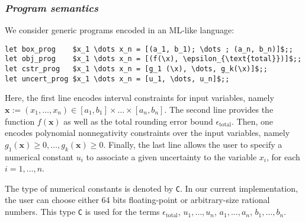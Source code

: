 \documentclass[preprint]{sigplanconf}
\newcommand{\code}[1]{\lstinline{#1}}
\newcommand{\x}{\mathbf{x}}
\theoremstyle{plain}
\begin{document}
\subsubsection*{\textit{Program semantics}}
%
We consider generic programs encoded in an ML-like language:
\begin{lstlisting}
let box_prog    $x_1 \dots x_n = [(a_1, b_1); \dots ; (a_n, b_n)]$;;
let obj_prog    $x_1 \dots x_n = [(f(\x), \epsilon_{\text{total}})]$;;
let cstr_prog   $x_1 \dots x_n = [g_1 (\x), \dots, g_k(\x)]$;;
let uncert_prog $x_1 \dots x_n = [u_1, \dots, u_n]$;;
\end{lstlisting}
Here, the first line encodes interval constraints for input variables, namely $\x := (x_1, \dots, x_n) \in [a_1, b_1]\times \dots \times [a_n, b_n]$.
The second line provides the function $f(\x)$ as well as the total rounding error bound $\epsilon_{\text{total}}$.
Then, one encodes polynomial nonnegativity constraints over the input variables, namely $g_1(\x) \geq 0, \dots, g_k(\x) \geq 0$. Finally, the last line allows the user to specify a numerical constant $u_i$ to associate a given uncertainty to the variable $x_i$, for each $i= 1, \dots, n$.

The type of numerical constants is denoted by \code{C}. In our current implementation, the user can choose either 64 bits floating-point or arbitrary-size rational numbers. This type \code{C} is used for the terms $\epsilon_{\text{total}}$, $u_1, \dots, u_n$, $a_1, \dots, a_n$, $b_1, \dots, b_n$.
\end{document}
